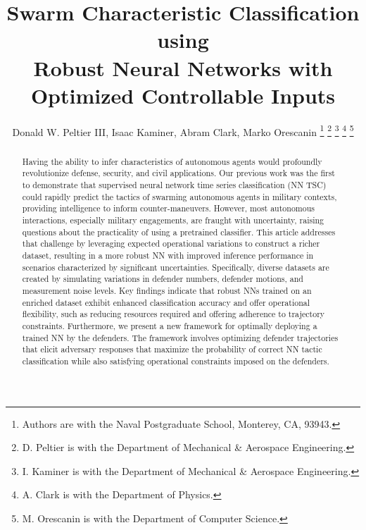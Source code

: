 \documentclass[journal]{IEEEtran} %
\begin{document}
\title{Swarm Characteristic Classification using\\
        Robust Neural Networks with\\
        Optimized Controllable Inputs}
\author{Donald W. Peltier III,
        Isaac Kaminer,
        Abram Clark,
        Marko Orescanin%
\thanks{Authors are with the Naval Postgraduate School, Monterey, CA, 93943.}%
\thanks{D. Peltier is with the Department of Mechanical \& Aerospace Engineering.}%
\thanks{I. Kaminer is with the Department of Mechanical \& Aerospace Engineering.}%
\thanks{A. Clark is with the Department of Physics.}%
\thanks{M. Orescanin is with the Department of Computer Science.}}%
\maketitle



\begin{abstract}
Having the ability to infer characteristics of autonomous agents would profoundly revolutionize defense, security, and civil applications. Our previous work was the first to demonstrate that supervised neural network time series classification (NN TSC) could rapidly predict the tactics of swarming autonomous agents in military contexts, providing intelligence to inform counter-maneuvers. However, most autonomous interactions, especially military engagements, are fraught with uncertainty, raising questions about the practicality of using a pretrained classifier. This article addresses that challenge by leveraging expected operational variations to construct a richer dataset, resulting in a more robust NN with improved inference performance in scenarios characterized by significant uncertainties. Specifically, diverse datasets are created by simulating variations in defender numbers, defender motions, and measurement noise levels. Key findings indicate that robust NNs trained on an enriched dataset exhibit enhanced classification accuracy and offer operational flexibility, such as reducing resources required and offering adherence to trajectory constraints. Furthermore, we present a new framework for optimally deploying a trained NN by the defenders. The framework involves optimizing defender trajectories that elicit  adversary responses that maximize the probability of correct NN tactic classification while also satisfying operational constraints imposed on the defenders.
\end{abstract}
\end{document}
